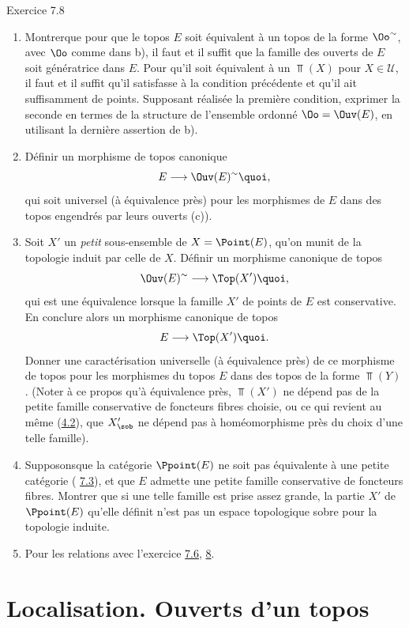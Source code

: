 \documentclass[10pt]{../fichiers-configuration-latex/smfart}
\begin{document}
\begin{enonce*}[remark]{Exercice 7.8}
\begin{enumerate}
\item Montrer\pageoriginale que pour que le topos $E$ soit équivalent
à un topos de la forme $\Oo^{\sim}$, avec $\Oo$ comme dans b), il faut
et il suffit que la famille des ouverts de $E$ soit génératrice dans
$E$. Pour qu'il soit équivalent à un $\Top(X)$ pour $X\in
𝒰$, il faut et il suffit qu'il satisfasse à la condition
précédente et qu'il ait suffisamment de points. Supposant réalisée
la première condition, exprimer la seconde en termes de la structure
de l'ensemble ordonné $\Oo=\Ouv(E)$, en utilisant la dernière
assertion de b).

\item Définir un morphisme de topos canonique
$$
E\longrightarrow \Ouv(E)^{\sim}{\quoi},
$$
qui soit universel (à équivalence près) pour les morphismes de $E$
dans des topos engendrés par leurs ouverts (\cf c)).

\item Soit $X'$ un \emph{petit} sous-ensemble de $X=\Point(E)$, qu'on
munit de la topologie induit par celle de $X$. Définir un morphisme
canonique de topos
$$
\Ouv(E)^{\sim}\longrightarrow \Top(X'){\quoi},
$$
qui est une équivalence lorsque la famille $X'$ de points de $E$ est
conservative. En conclure alors un morphisme canonique de topos
$$
E\longrightarrow \Top(X'){\quoi}.
$$
Donner une caractérisation universelle (à équivalence près) de ce
morphisme de topos pour les morphismes du topos $E$ dans des topos
de la forme $\Top(Y)$. (Noter à ce propos qu'à équivalence près,
$\Top(X')$ ne dépend pas de la petite famille conservative de
foncteurs fibres choisie, ou ce qui revient au même
(\hyperref[IV.subsec4.2]{4.2}), que $X'_{\sob}$ ne dépend pas à homéomorphisme
près du choix d'une telle famille).

\item Supposons\pageoriginale que la catégorie $\Ppoint(E)$ ne
soit pas équivalente à une petite catégorie (\cf
\hyperref[IV.subsec7.3]{7.3}), et que $E$ admette une petite famille
conservative de foncteurs fibres. Montrer que si une telle famille
est prise assez grande, la partie $X'$ de $\Ppoint(E)$ qu'elle
définit n'est pas un espace topologique sobre pour la topologie
induite.

\item Pour les relations avec l'exercice \hyperref[IV.exer7.6]{7.6}, \cf \hyperref[IV.sec8]{8}.
\end{enumerate}
\end{enonce*}

\section{Localisation. Ouverts d'un topos}
\end{document}
